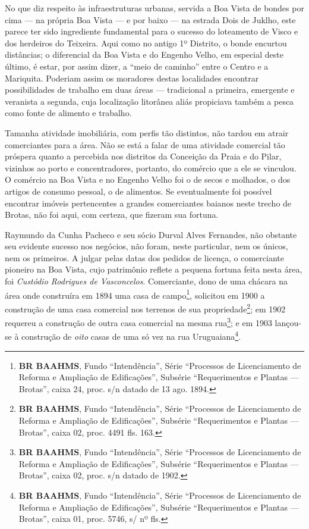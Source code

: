 



No que diz respeito às infraestruturas urbanas, servida a Boa Vista de bondes por cima --- na própria Boa Vista --- e por baixo --- na estrada Dois de Juklho, este parece ter sido ingrediente fundamental para o sucesso do loteamento de Visco e dos herdeiros do Teixeira. Aqui como no antigo 1º Distrito, o bonde encurtou distâncias; o diferencial da Boa Vista e do Engenho Velho, em especial deste último, é estar, por assim dizer, a ``meio de caminho'' entre o Centro e a Mariquita. Poderiam assim os moradores destas localidades encontrar possibilidades de trabalho em duas áreas --- tradicional a primeira, emergente e veranista a segunda, cuja localização litorânea aliás propiciava também a pesca como fonte de alimento e trabalho.


Tamanha atividade imobiliária, com perfis tão distintos, não tardou em atrair comerciantes para a área. Não se está a falar de uma atividade comercial tão próspera quanto a percebida nos distritos da Conceição da Praia e do Pilar, vizinhos ao porto e concentradores, portanto, do comércio que a ele se vinculou. O comércio na Boa Vista e no Engenho Velho foi o de secos e molhados, o dos artigos de consumo pessoal, o de alimentos. Se eventualmente foi possível encontrar imóveis pertencentes a grandes comerciantes baianos neste trecho de Brotas, não foi aqui, com certeza, que fizeram sua fortuna.

Raymundo da Cunha Pacheco e seu sócio Durval Alves Fernandes, não obstante seu evidente sucesso nos negócios, não foram, neste particular, nem os únicos, nem os primeiros. A julgar pelas datas dos pedidos de licença, o comerciante pioneiro na Boa Vista, cujo patrimônio reflete a pequena fortuna feita nesta área, foi \textit{Custódio Rodrigues de Vasconcelos}. Comerciante, dono de uma chácara na área onde construíra em 1894 uma casa de campo\footnote{\textbf{BR BAAHMS}, Fundo ``Intendência'', Série ``Processos de Licenciamento de Reforma e Ampliação de Edificações'', Subsérie ``Requerimentos e Plantas --- Brotas'', caixa 24, proc. s/n datado de 13 ago. 1894.}, solicitou em 1900 a construção de uma casa comercial nos terrenos de sua propriedade\footnote{\textbf{BR BAAHMS}, Fundo ``Intendência'', Série ``Processos de Licenciamento de Reforma e Ampliação de Edificações'', Subsérie ``Requerimentos e Plantas --- Brotas'', caixa 02, proc. 4491 fls. 163.}; em 1902 requereu a construção de outra casa comercial na mesma rua\footnote{\textbf{BR BAAHMS}, Fundo ``Intendência'', Série ``Processos de Licenciamento de Reforma e Ampliação de Edificações'', Subsérie ``Requerimentos e Plantas --- Brotas'', caixa 02, proc. s/n datado de 1902.}; e em 1903 lançou-se à construção de \textit{oito} casas de uma só vez na rua Uruguaiana\footnote{\textbf{BR BAAHMS}, Fundo ``Intendência'', Série ``Processos de Licenciamento de Reforma e Ampliação de Edificações'', Subsérie ``Requerimentos e Plantas --- Brotas'', caixa 01, proc. 5746, s/ nº fls.}.

